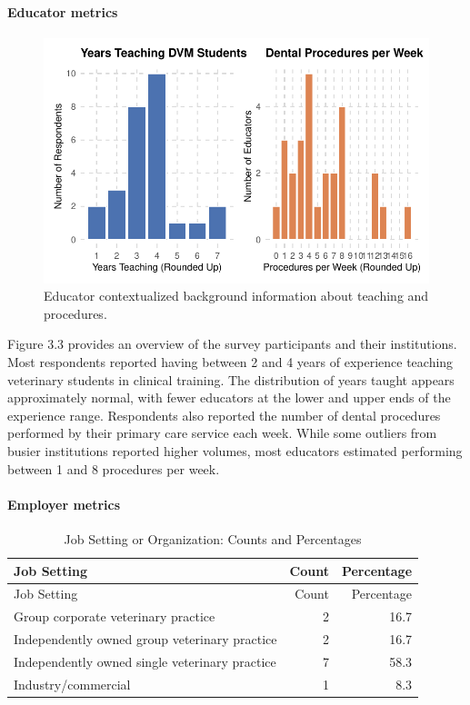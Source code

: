 \documentclass[
  11pt,
  letterpaper,
  DIV=11,
  numbers=noendperiod]{scrartcl}
\let\oldparagraph\paragraph
\renewcommand{\paragraph}[1]{\oldparagraph{#1}\mbox{}}
\numberwithin{figure}{section}
\begin{document}
\hypertarget{educator-metrics}{%
\paragraph{Educator metrics}\label{educator-metrics}}

\begin{figure}[H]

{\centering \includegraphics{Final-Project_files/figure-pdf/Data_Desc_03-1.pdf}

}

\caption{Educator contextualized background information about teaching
and procedures.}

\end{figure}

Figure 3.3 provides an overview of the survey participants and their
institutions. Most respondents reported having between 2 and 4 years of
experience teaching veterinary students in clinical training. The
distribution of years taught appears approximately normal, with fewer
educators at the lower and upper ends of the experience range.
Respondents also reported the number of dental procedures performed by
their primary care service each week. While some outliers from busier
institutions reported higher volumes, most educators estimated
performing between 1 and 8 procedures per week.

\hypertarget{employer-metrics}{%
\paragraph{Employer metrics}\label{employer-metrics}}

\begin{longtable}[]{@{}lrr@{}}
\caption{Job Setting or Organization: Counts and
Percentages}\tabularnewline
\toprule\noalign{}
Job Setting & Count & Percentage \\
\midrule\noalign{}
\endfirsthead
\toprule\noalign{}
Job Setting & Count & Percentage \\
\midrule\noalign{}
\endhead
\bottomrule\noalign{}
\endlastfoot
Group corporate veterinary practice & 2 & 16.7 \\
Independently owned group veterinary practice & 2 & 16.7 \\
Independently owned single veterinary practice & 7 & 58.3 \\
Industry/commercial & 1 & 8.3 \\
\end{longtable}
\end{document}
